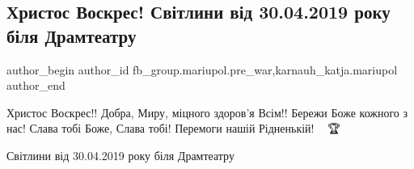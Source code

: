  
 
 
 
 

\subsection{Христос Воскрес! Світлини від 30.04.2019 року біля Драмтеатру}
\label{sec:16_04_2023.fb.fb_group.mariupol.pre_war.1.pysanky_teatr_30_04_2019}
 
\ifcmt
 author_begin
   author_id fb_group.mariupol.pre_war,karnauh_katja.mariupol
 author_end
\fi

Христос Воскрес!! Добра, Миру, міцного здоров'я Всім!! Бережи Боже кожного з
нас! Слава тобі Боже, Слава тобі! Перемоги нашій Рідненькій! 🙏🇺🇦🏆

Світлини від 30.04.2019 року біля Драмтеатру

